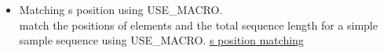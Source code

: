 \begin{itemize}
	\item Matching s position using USE\_MACRO.\\
	match the positions of elements and the total sequence length for a simple sample sequence using USE\_MACRO. 
        \href{http://cern.ch/madx/madX/examples/match/s-match-usemacro/job.s-match-usemacro.madx}{s position matching}

\end{itemize}


